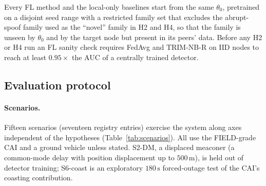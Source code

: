 \documentclass[12pt,a4paper]{article}
\begin{document}
Every FL method and the local-only baselines start from the same $\theta_0$, pretrained on a disjoint seed range with a restricted family set that excludes the abrupt-spoof family used as the ``novel'' family in H2 and H4, so that the family is unseen by $\theta_0$ and by the target node but present in its peers' data. Before any H2 or H4 run an FL sanity check requires FedAvg and TRIM-NB-R on IID nodes to reach at least $0.95\times$ the AUC of a centrally trained detector.

\subsection{Evaluation protocol}
\label{sec:setup}
\paragraph{Scenarios.}
Fifteen scenarios (seventeen registry entries) exercise the system along axes independent of the hypotheses (Table~\ref{tab:scenarios}). All use the FIELD-grade CAI and a ground vehicle unless stated. S2-DM, a displaced meaconer (a common-mode delay with position displacement up to $500\,\mathrm{m}$), is held out of detector training; S6-coast is an exploratory $180\,\mathrm{s}$ forced-outage test of the CAI's coasting contribution.
\end{document}
